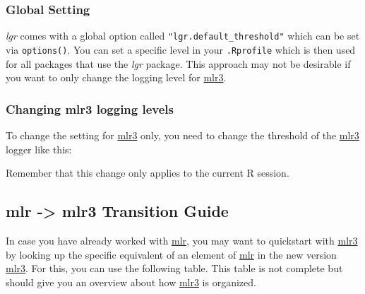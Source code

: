 \documentclass[]{article}
\newenvironment{Shaded}{}{}
\newcommand{\KeywordTok}[1]{\textcolor[rgb]{0.00,0.00,1.00}{#1}}
\newcommand{\NormalTok}[1]{#1}
\newcommand{\OperatorTok}[1]{#1}
\newcommand{\StringTok}[1]{\textcolor[rgb]{0.00,0.50,0.50}{#1}}
\renewenvironment{Shaded} {\begin{snugshade}\small} {\end{snugshade}}
\begin{document}
\hypertarget{global-setting}{%
\subsubsection{Global Setting}\label{global-setting}}

\emph{lgr} comes with a global option called \texttt{"lgr.default\_threshold"} which can be set via \texttt{options()}.
You can set a specific level in your \texttt{.Rprofile} which is then used for all packages that use the \emph{lgr} package.
This approach may not be desirable if you want to only change the logging level for \href{https://mlr3.mlr-org.com}{mlr3}.

\hypertarget{changing-mlr3-logging-levels}{%
\subsubsection{Changing mlr3 logging levels}\label{changing-mlr3-logging-levels}}

To change the setting for \href{https://mlr3.mlr-org.com}{mlr3} only, you need to change the threshold of the \href{https://mlr3.mlr-org.com}{mlr3} logger like this:

\begin{Shaded}
\end{Shaded}

Remember that this change only applies to the current R session.

\hypertarget{transition}{%
\subsection{mlr -\textgreater{} mlr3 Transition Guide}\label{transition}}

In case you have already worked with \href{https://mlr.mlr-org.com}{mlr}, you may want to quickstart with \href{https://mlr3.mlr-org.com}{mlr3} by looking up the specific equivalent of an element of \href{https://mlr.mlr-org.com}{mlr} in the new version \href{https://mlr3.mlr-org.com}{mlr3}.
For this, you can use the following table.
This table is not complete but should give you an overview about how \href{https://mlr3.mlr-org.com}{mlr3} is organized.

\begingroup\fontsize{13}{15}\selectfont
\end{document}
